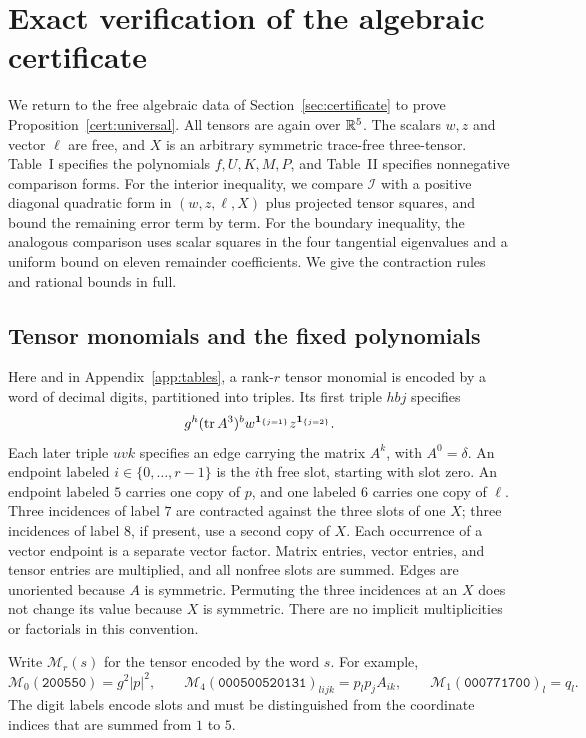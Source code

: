 \section{Exact verification of the algebraic certificate}
\label{sec:certificate-proof}

We return to the free algebraic data of Section~\ref{sec:certificate}
to prove Proposition~\ref{cert:universal}. All tensors are again over
$\mathbb R^5$. The scalars $w,z$ and vector $\ell$ are free, and $X$ is an
arbitrary symmetric trace-free three-tensor.
Table~I specifies the polynomials $f,U,K,M,P$, and Table~II specifies
nonnegative comparison forms. For the interior inequality, we compare
$\mathcal I$ with a positive diagonal quadratic form in $(w,z,\ell,X)$
plus projected tensor squares, and bound the remaining error term by term.
For the boundary inequality, the analogous comparison uses scalar squares
in the four tangential eigenvalues and a uniform bound on eleven remainder
coefficients. We give the contraction rules and rational bounds in full.

\subsection{Tensor monomials and the fixed polynomials}\label{cert:decode}

Here and in Appendix~\ref{app:tables}, a rank-$r$ tensor monomial is encoded by
a word of decimal digits, partitioned into triples.  Its first triple $hbj$
specifies
\[
 g^h(\operatorname{tr} A^3)^b w^{\mathbf1_{\{j=1\}}}
                         z^{\mathbf1_{\{j=2\}}}.
\]
Each later triple $uvk$ specifies an edge carrying the matrix $A^k$, with
$A^0=\delta$.  An endpoint labeled $i\in\{0,\ldots,r-1\}$ is the $i$th free
slot, starting with slot zero.  An endpoint labeled $5$ carries one copy of
$p$, and one labeled $6$ carries one copy of $\ell$.  Three incidences of label
$7$ are contracted against the three slots of one $X$; three incidences of
label $8$, if present, use a second copy of $X$.  Each occurrence of a vector
endpoint is a separate vector factor.  Matrix entries, vector entries, and
tensor entries are multiplied, and all nonfree slots are summed.  Edges are
unoriented because $A$ is symmetric.  Permuting the three incidences at an
$X$ does not change its value because $X$ is symmetric.  There are no
implicit multiplicities or factorials in this convention.

Write $\mathcal M_r(s)$ for the tensor encoded by the word $s$.  For example,
\[
 \mathcal M_0(\texttt{200550})=g^2|p|^2,\qquad
 \mathcal M_4(\texttt{000500520131})_{lijk}=p_lp_jA_{ik},\qquad
 \mathcal M_1(\texttt{000771700})_l=q_l.
\]
The digit labels encode slots and must be distinguished from the coordinate
indices that are summed from $1$ to $5$.

